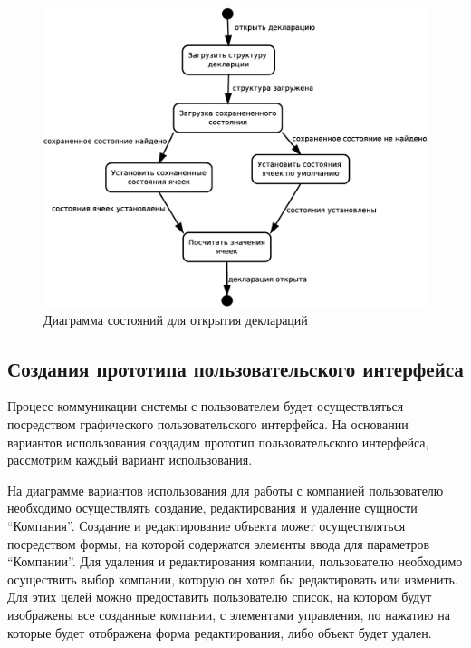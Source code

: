 \documentclass[14pt,a4paper]{reportmod}
\begin{document}
\begin{figure}
  \centering
  \includegraphics[scale=0.4]{uml/states_1}
  \caption{Диаграмма состояний для открытия деклараций}
  \label{pic:states_1}
\end{figure}

\subsection{Создания прототипа пользовательского интерфейса}

Процесс коммуникации системы с пользователем будет осуществляться посредством графического пользовательского интерфейса. На основании вариантов использования создадим прототип пользовательского интерфейса, рассмотрим каждый вариант использования.

На диаграмме вариантов использования для работы с компанией пользователю необходимо осуществлять создание, редактирования и удаление сущности ``Компания''. Создание и редактирование объекта может осуществляться посредством формы, на которой содержатся элементы ввода для параметров ``Компании''.
Для удаления и редактирования компании, пользователю необходимо осуществить выбор компании, которую он хотел бы редактировать или изменить. Для этих целей можно предоставить пользователю список, на котором будут изображены все созданные компании, с элементами управления, по нажатию на которые будет отображена форма редактирования, либо объект будет удален.
\end{document}
